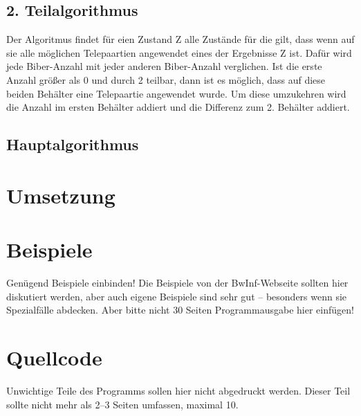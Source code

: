 \documentclass[a4paper,10pt,ngerman]{scrartcl}
\begin{document}
\subsection{2. Teilalgorithmus}
Der Algoritmus findet für eien Zustand Z alle Zustände für die gilt, dass wenn auf sie alle möglichen Telepaartien angewendet eines der Ergebnisse Z ist. Dafür wird jede Biber-Anzahl mit jeder anderen Biber-Anzahl verglichen. Ist die erste Anzahl größer als 0 und durch 2 teilbar, dann ist es möglich, dass auf diese beiden Behälter eine Telepaartie angewendet wurde. Um diese umzukehren wird die Anzahl im ersten Behälter addiert und die Differenz zum 2. Behälter addiert.
\subsection{Hauptalgorithmus}
\section{Umsetzung}

\section{Beispiele}
Genügend Beispiele einbinden! Die Beispiele von der BwInf-Webseite sollten hier diskutiert werden, aber auch eigene Beispiele sind sehr gut – besonders wenn sie Spezialfälle abdecken. Aber bitte nicht 30 Seiten Programmausgabe hier einfügen!

\section{Quellcode}
Unwichtige Teile des Programms sollen hier nicht abgedruckt werden. Dieser Teil sollte nicht mehr als 2–3 Seiten umfassen, maximal 10.
\end{document}
